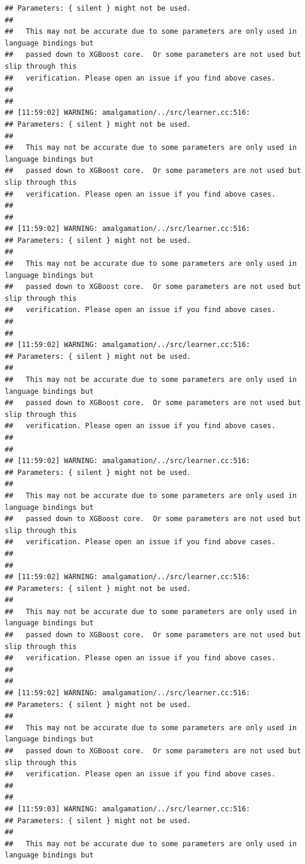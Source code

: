 \documentclass[AMS,STIX2COL]{WileyNJD-v2}\usepackage[]{graphicx}\usepackage[]{color}
\makeatletter
\newenvironment{kframe}{%
 \def\at@end@of@kframe{}%
 \ifinner\ifhmode%
  \def\at@end@of@kframe{\end{minipage}}%
  \begin{minipage}{\columnwidth}%
 \fi\fi%
 \def\FrameCommand##1{\hskip\@totalleftmargin \hskip-\fboxsep
 \colorbox{shadecolor}{##1}\hskip-\fboxsep
     \hskip-\linewidth \hskip-\@totalleftmargin \hskip\columnwidth}%
 \MakeFramed {\advance\hsize-\width
   \@totalleftmargin\z@ \linewidth\hsize
   \@setminipage}}%
 {\par\unskip\endMakeFramed%
 \at@end@of@kframe}
\newenvironment{knitrout}{}{} %
\makeatother
\begin{document}
\begin{knitrout}
\begin{kframe}
\begin{verbatim}
## Parameters: { silent } might not be used.
## 
##   This may not be accurate due to some parameters are only used in language bindings but
##   passed down to XGBoost core.  Or some parameters are not used but slip through this
##   verification. Please open an issue if you find above cases.
## 
## 
## [11:59:02] WARNING: amalgamation/../src/learner.cc:516: 
## Parameters: { silent } might not be used.
## 
##   This may not be accurate due to some parameters are only used in language bindings but
##   passed down to XGBoost core.  Or some parameters are not used but slip through this
##   verification. Please open an issue if you find above cases.
## 
## 
## [11:59:02] WARNING: amalgamation/../src/learner.cc:516: 
## Parameters: { silent } might not be used.
## 
##   This may not be accurate due to some parameters are only used in language bindings but
##   passed down to XGBoost core.  Or some parameters are not used but slip through this
##   verification. Please open an issue if you find above cases.
## 
## 
## [11:59:02] WARNING: amalgamation/../src/learner.cc:516: 
## Parameters: { silent } might not be used.
## 
##   This may not be accurate due to some parameters are only used in language bindings but
##   passed down to XGBoost core.  Or some parameters are not used but slip through this
##   verification. Please open an issue if you find above cases.
## 
## 
## [11:59:02] WARNING: amalgamation/../src/learner.cc:516: 
## Parameters: { silent } might not be used.
## 
##   This may not be accurate due to some parameters are only used in language bindings but
##   passed down to XGBoost core.  Or some parameters are not used but slip through this
##   verification. Please open an issue if you find above cases.
## 
## 
## [11:59:02] WARNING: amalgamation/../src/learner.cc:516: 
## Parameters: { silent } might not be used.
## 
##   This may not be accurate due to some parameters are only used in language bindings but
##   passed down to XGBoost core.  Or some parameters are not used but slip through this
##   verification. Please open an issue if you find above cases.
## 
## 
## [11:59:02] WARNING: amalgamation/../src/learner.cc:516: 
## Parameters: { silent } might not be used.
## 
##   This may not be accurate due to some parameters are only used in language bindings but
##   passed down to XGBoost core.  Or some parameters are not used but slip through this
##   verification. Please open an issue if you find above cases.
## 
## 
## [11:59:03] WARNING: amalgamation/../src/learner.cc:516: 
## Parameters: { silent } might not be used.
## 
##   This may not be accurate due to some parameters are only used in language bindings but

\end{verbatim}
\end{kframe}
\end{knitrout}
\end{document}
